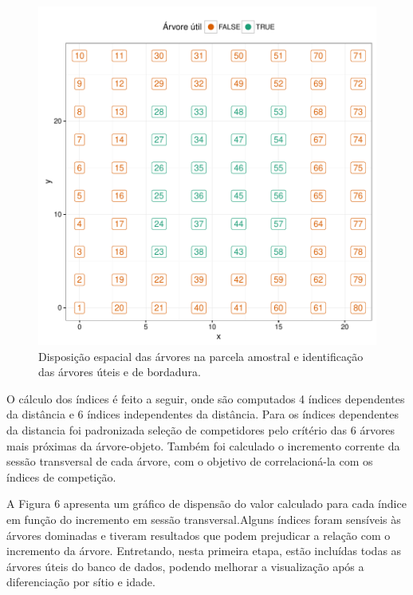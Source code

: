 \documentclass[article]{jss}
\begin{document}
\begin{CodeChunk}
\begin{figure}

{\centering \includegraphics{comp3-paper_files/figure-latex/plot_base-1} 

}

\caption[Disposição espacial das árvores na parcela amostral e identificação das árvores úteis e de bordadura]{Disposição espacial das árvores na parcela amostral e identificação das árvores úteis e de bordadura.}\label{fig:plot_base}
\end{figure}
\end{CodeChunk}

O cálculo dos índices é feito a seguir, onde são computados 4 índices
dependentes da distância e 6 índices independentes da distância. Para os
índices dependentes da distancia foi padronizada seleção de competidores
pelo crítério das 6 árvores mais próximas da árvore-objeto. Também foi
calculado o incremento corrente da sessão transversal de cada árvore,
com o objetivo de correlacioná-la com os índices de competição.

A Figura 6 apresenta um gráfico de dispensão do valor calculado para
cada índice em função do incremento em sessão transversal.Alguns índices
foram sensíveis às árvores dominadas e tiveram resultados que podem
prejudicar a relação com o incremento da árvore. Entretando, nesta
primeira etapa, estão incluídas todas as árvores úteis do banco de
dados, podendo melhorar a visualização após a diferenciação por sítio e
idade.
\end{document}
